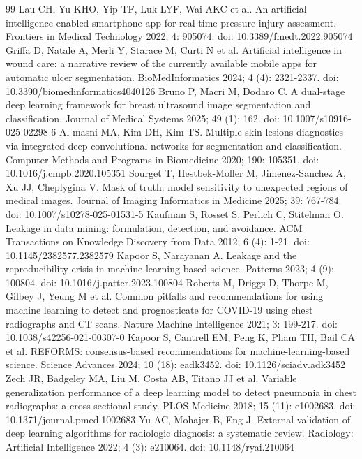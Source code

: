 \documentclass{elektr}
\begin{document}
\begin{thebibliography}{99}
 Lau CH, Yu KHO, Yip TF, Luk LYF, Wai AKC et al. An artificial intelligence-enabled smartphone app for real-time pressure injury assessment. Frontiers in Medical Technology 2022; 4: 905074. doi: 10.3389/fmedt.2022.905074
 Griffa D, Natale A, Merli Y, Starace M, Curti N et al. Artificial intelligence in wound care: a narrative review of the currently available mobile apps for automatic ulcer segmentation. BioMedInformatics 2024; 4 (4): 2321-2337. doi: 10.3390/biomedinformatics4040126
 Bruno P, Macri M, Dodaro C. A dual-stage deep learning framework for breast ultrasound image segmentation and classification. Journal of Medical Systems 2025; 49 (1): 162. doi: 10.1007/s10916-025-02298-6
 Al-masni MA, Kim DH, Kim TS. Multiple skin lesions diagnostics via integrated deep convolutional networks for segmentation and classification. Computer Methods and Programs in Biomedicine 2020; 190: 105351. doi: 10.1016/j.cmpb.2020.105351
 Sourget T, Hestbek-Moller M, Jimenez-Sanchez A, Xu JJ, Cheplygina V. Mask of truth: model sensitivity to unexpected regions of medical images. Journal of Imaging Informatics in Medicine 2025; 39: 767-784. doi: 10.1007/s10278-025-01531-5
 Kaufman S, Rosset S, Perlich C, Stitelman O. Leakage in data mining: formulation, detection, and avoidance. ACM Transactions on Knowledge Discovery from Data 2012; 6 (4): 1-21. doi: 10.1145/2382577.2382579
 Kapoor S, Narayanan A. Leakage and the reproducibility crisis in machine-learning-based science. Patterns 2023; 4 (9): 100804. doi: 10.1016/j.patter.2023.100804
 Roberts M, Driggs D, Thorpe M, Gilbey J, Yeung M et al. Common pitfalls and recommendations for using machine learning to detect and prognosticate for COVID-19 using chest radiographs and CT scans. Nature Machine Intelligence 2021; 3: 199-217. doi: 10.1038/s42256-021-00307-0
 Kapoor S, Cantrell EM, Peng K, Pham TH, Bail CA et al. REFORMS: consensus-based recommendations for machine-learning-based science. Science Advances 2024; 10 (18): eadk3452. doi: 10.1126/sciadv.adk3452
 Zech JR, Badgeley MA, Liu M, Costa AB, Titano JJ et al. Variable generalization performance of a deep learning model to detect pneumonia in chest radiographs: a cross-sectional study. PLOS Medicine 2018; 15 (11): e1002683. doi: 10.1371/journal.pmed.1002683
 Yu AC, Mohajer B, Eng J. External validation of deep learning algorithms for radiologic diagnosis: a systematic review. Radiology: Artificial Intelligence 2022; 4 (3): e210064. doi: 10.1148/ryai.210064

\end{thebibliography}
\end{document}
